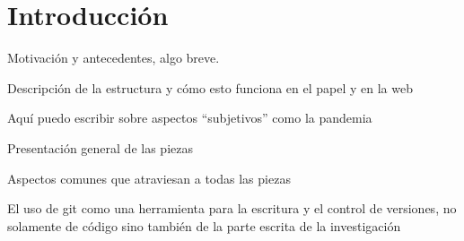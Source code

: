 \chapter{Introducción}

Motivación y antecedentes, algo breve.

Descripción de la estructura y cómo esto funciona en el papel y en la web 

Aquí puedo escribir sobre aspectos ``subjetivos'' como la pandemia 

Presentación general de las piezas 

Aspectos comunes que atraviesan a todas las piezas 

El uso de git como una herramienta para la escritura y el control de versiones, no solamente de código sino también de la parte escrita de la investigación 
